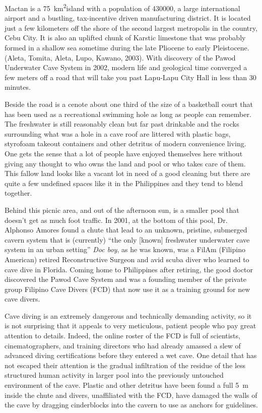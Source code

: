 Mactan is a \SI{75}{\kilo\metre\squared}island with a population of \num{430000}, a large international airport and a bustling, tax-incentive driven manufacturing district. 
It is located just a few kilometers off the shore of the second largest metropolis in the country, Cebu City. It is also an uplifted chunk of Karstic limestone that was probably formed in a shallow sea sometime during the late Pliocene to early Pleistocene. (Aleta, Tomita, Aleta, Lupo, Kawano, 2003). With discovery of the Pawod Underwater Cave System in 2002, modern life and geological time converged a few meters off a road that will take you past Lapu-Lapu City Hall in less than 30 minutes.

Beside the road is a cenote about one third of the size of a basketball court that has been used as a recreational swimming hole as long as people can remember. The freshwater is still reasonably clean but far past drinkable and the rocks surrounding what was a hole in a cave roof are littered with plastic bags, styrofoam takeout containers and other detritus of modern convenience living. One gets the sense that a lot of people have enjoyed themselves here without giving any thought to who owns the land and pool or who takes care of them. This fallow land looks like a vacant lot in need of a good cleaning but there are quite a few undefined spaces like it in the Philippines and they tend to blend together.

Behind this picnic area, and out of the afternoon sun, is a smaller pool that doesn’t get as much foot traffic.  In 2001, at the bottom of this pool, Dr. Alphonso Amores found a chute that lead to an unknown, pristine, submerged cavern system that is (currently) “the only [known] freshwater underwater cave system in an urban setting” %
\textit{Doc boy}, as he was known, was a FilAm (Filipino American) retired Reconstructive Surgeon and avid scuba diver who learned to cave dive in Florida. Coming home to Philippines after retiring, the good doctor discovered the Pawod Cave System and was a founding member of the private group Filipino Cave Divers (FCD) that now use it as a training ground for new cave divers. 

Cave diving is an extremely dangerous and technically demanding activity, so it is not surprising that it appeals to very meticulous, patient people who pay great attention to details. Indeed, the online roster of the FCD is full of scientists, cinematographers, and training directors who had already amassed a slew of advanced diving certifications before they entered a wet cave. One detail that has not escaped their attention is the gradual infiltration of the residue of the less structured human activity in larger pool into the previously untouched environment of the cave. Plastic and other detritus have been found a full \SI{5}{\metre} inside the chute and divers, unaffiliated with the FCD, have damaged the walls of the cave by dragging cinderblocks into the cavern to use as anchors for guidelines. 

